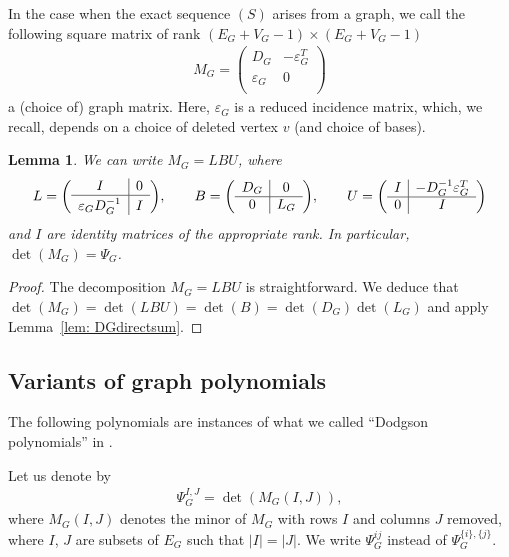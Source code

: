 \documentclass[pdftex]{sigma}%
\newtheorem{lem}[thm]{Lemma}
\numberwithin{equation}{section}
\newcommand{\0}{\color{blue}{\mathsf{0}}}
\begin{document}
 In the case when the exact sequence $(S)$ arises from a graph, we call
 the following square matrix of rank
 $(E_G+V_G-1) \times (E_G+V_G-1)$
\begin{gather*}
M_G = \left(
\begin{array}{c|c}
 D_G & - \varepsilon^T_G \\ \hline
 \varepsilon_G & 0 \\
\end{array}
\right)
\end{gather*}
a (choice of) graph matrix. Here, $\varepsilon_G$ is a reduced incidence matrix, which, we recall, depends on a choice of deleted vertex $v$ (and choice of bases).

\begin{lem} \label{lemMGLBU}
We can write $M_G = LBU$, where
\begin{gather*}
L= \left(\begin{array}{c|c}
 I & 0 \\ \hline
 \varepsilon_G D_G^{-1^{\vphantom{1}}} & I
\end{array}\right)\!, \qquad
B = \left(\begin{array}{c|c}
 D_G & 0 \\ \hline
 0 & L_G
\end{array}\right)\!, \qquad
U = \left(\begin{array}{c|c}
 I & - D^{-1}_G \varepsilon^T_G \\ \hline
 0 & I
\end{array}\right)
\end{gather*}
and $I$ are identity matrices of the appropriate rank. In particular, $\det(M_G) = \Psi_G$.
\end{lem}

\begin{proof}
The decomposition $M_G = LBU$ is straightforward. We deduce that
$\det(M_G) = \det(LBU)=\det(B)= \det(D_G) \det(L_G) $ and apply Lemma~\ref{lem: DGdirectsum}.
\end{proof}

\subsection{Variants of graph polynomials}
The following polynomials are instances of what we called ``Dodgson polynomials'' in \cite{PeriodsFeynman}.
\begin{defn} \label{defn: Dodgson}
Let us denote by
\begin{gather*}
\Psi^{I,J}_G = \det(M_G(I,J)),
\end{gather*}
where $M_G(I,J)$ denotes the minor of $M_G$ with rows $I$ and columns $J$ removed, where $I$, $J$ are subsets of $E_G$ such that $|I|=|J|$.
 We write $\Psi_G^{ij}$ instead of $\Psi_G^{\{i\}, \{j\}}$. \end{defn}
\end{document}
